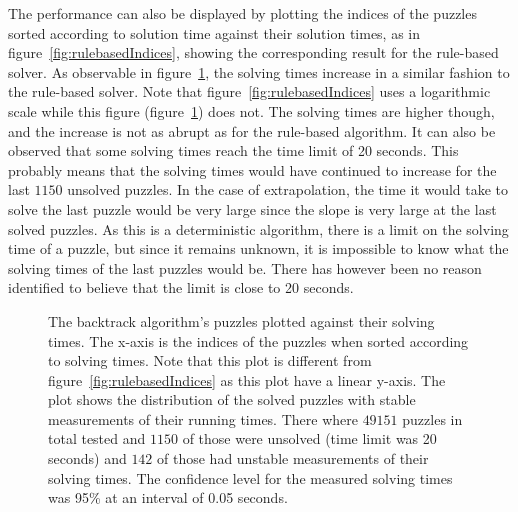 \documentclass[a4paper,11pt]{kth-mag}
\begin{document}
\FloatBarrier
The performance can also be displayed by plotting the indices of the puzzles sorted according to solution time against their solution times, as in figure~\ref{fig:rulebasedIndices}, showing the corresponding result for the rule-based solver.
As observable in figure~\ref{fig:backtrackIndices}, the solving times increase in a similar fashion to the rule-based solver.
Note that figure~\ref{fig:rulebasedIndices} uses a logarithmic scale while this figure (figure~\ref{fig:backtrackIndices}) does not.
The solving times are higher though, and the increase is not as abrupt as for the rule-based algorithm.
It can also be observed that some solving times reach the time limit of 20 seconds.
This probably means that the solving times would have continued to increase for the last $1150$ unsolved puzzles.
In the case of extrapolation, the time it would take to solve the last puzzle would be very large since the slope is very large at the last solved puzzles. 
As this is a deterministic algorithm, there is a limit on the solving time of a puzzle, but since it remains unknown, it is impossible to know what the solving times of the last puzzles would be.
There has however been no reason identified to believe that the limit is close to 20 seconds. 
\\
\begin{figure}[here] 
\noindent{}
\vspace{-15pt}
\caption[Plot of backtrack solving times]{The backtrack algorithm's puzzles plotted against their solving times. The x-axis is the indices of the puzzles when sorted according to solving times. Note that this plot is different from figure~\ref{fig:rulebasedIndices} as this plot have a linear y-axis. The plot shows the distribution of the solved puzzles with stable measurements of their running times. There where $49151$ puzzles in total tested and $1150$ of those were unsolved (time limit was 20 seconds) and $142$ of those had unstable measurements of their solving times. The confidence level for the measured solving times was 95\% at an interval of 0.05 seconds.}
\label{fig:backtrackIndices}
\end{figure}
\end{document}
